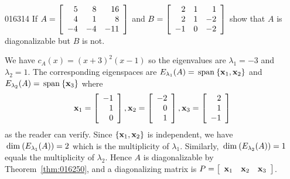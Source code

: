 \begin{example}{}{016314}
If $A = 
\left[ \begin{array}{rrr}
 5 &  8 & 16 \\
 4 &  1 &  8 \\
-4 & -4 & -11
\end{array} \right]$ and $B =
\left[ \begin{array}{rrr}
 2 & 1 &  1 \\
 2 & 1 & -2 \\
-1 & 0 & -2
\end{array} \right]$ show that $A$ is diagonalizable but $B$ is not.

\begin{solution}
We have $c_{A}(x) = (x + 3)^{2}(x - 1)$ so the eigenvalues are $\lambda_{1} = -3$ and $\lambda_{2} = 1$. The corresponding eigenspaces are $E_{\lambda_1}(A) = \thinspace\operatorname{span\medspace}\{\textbf{x}_{1}, \textbf{x}_{2}\}$ and $E_{\lambda_2}(A) = \thinspace\operatorname{span\medspace}\{\textbf{x}_{3}\}$ where
\begin{equation*}
\textbf{x}_1 = 
\left[ \begin{array}{r}
-1\\
1\\
0
\end{array} \right]
, \textbf{x}_2 = 
\left[ \begin{array}{r}
-2\\
0\\
1
\end{array} \right]
, \textbf{x}_3 = 
\left[ \begin{array}{r}
2\\
1\\
-1
\end{array} \right]
\end{equation*}
as the reader can verify. Since $\{\textbf{x}_{1}, \textbf{x}_{2}\}$ is independent, we have $\thinspace\operatorname{dim\medspace}(E_{\lambda_1}(A)) = 2$ which is the multiplicity of $\lambda_{1}$. Similarly, $\thinspace\operatorname{dim\medspace}(E_{\lambda_2}(A)) = 1$ equals the multiplicity of $\lambda_{2}$. Hence $A$ is diagonalizable
by Theorem~\ref{thm:016250}, and a diagonalizing matrix is $P = 
\left[ \begin{array}{ccc}
\textbf{x}_{1} & \textbf{x}_{2} & \textbf{x}_{3}
\end{array} \right]$.



\end{solution}
\end{example}
